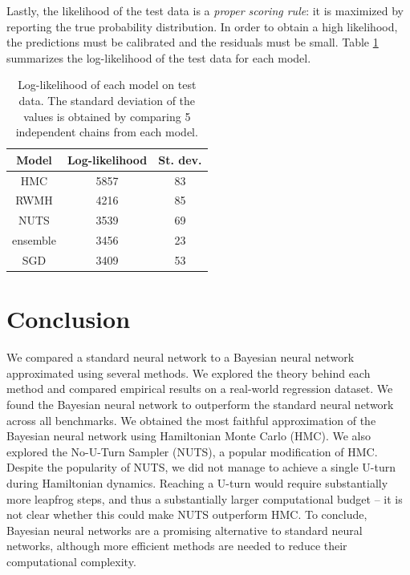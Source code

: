 \documentclass[12pt]{article}
\begin{document}
Lastly, the likelihood of the test data is a \textit{proper scoring rule}: it is maximized by reporting the true probability distribution. In order to obtain a high likelihood, the predictions must be calibrated and the residuals must be small. Table \ref{table_uci_loglike} summarizes the log-likelihood of the test data for each model.

\begin{table}[H]
\centering
\begin{tabular}{|c|c|c|}
\hline
Model    & Log-likelihood & St. dev. \\ \hline
HMC      & 5857           & 83       \\ \hline
RWMH     & 4216           & 85       \\ \hline
NUTS     & 3539           & 69       \\ \hline
ensemble & 3456           & 23       \\ \hline
SGD      & 3409           & 53       \\ \hline
\end{tabular}
\label{table_uci_loglike}
\caption{Log-likelihood of each model on test data. The standard deviation of the values is obtained by comparing 5 independent chains from each model.}
\end{table}

\newpage
\section{Conclusion}

We compared a standard neural network to a Bayesian neural network approximated using several methods. We explored the theory behind each method and compared empirical results on a real-world regression dataset. We found the Bayesian neural network to outperform the standard neural network across all benchmarks. We obtained the most faithful approximation of the Bayesian neural network using Hamiltonian Monte Carlo (HMC). We also explored the No-U-Turn Sampler (NUTS), a popular modification of HMC. Despite the popularity of NUTS, we did not manage to achieve a single U-turn during Hamiltonian dynamics. Reaching a U-turn would require substantially more leapfrog steps, and thus a substantially larger computational budget -- it is not clear whether this could make NUTS outperform HMC. To conclude, Bayesian neural networks are a promising alternative to standard neural networks, although more efficient methods are needed to reduce their computational complexity.

\clearpage

\end{document}
